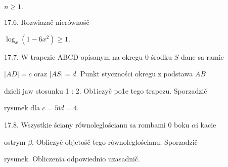 \documentclass[a4paper,12pt]{article}
\begin{document}
$n\geq 1.$

17.6. Rozwiazač nierównośč

$\log_{x}(1-6x^{2})\geq 1.$

17.7. $\mathrm{W}$ trapezie ABCD opisanym na okregu $0$ środku $S$ dane sa ramie

$|AD| =c$ oraz $|AS| =d$. Punkt styczności okregu $\mathrm{z}$ podstawa $AB$

dzieli $\mathrm{j}\mathrm{a}\mathrm{w}$ stosunku 1 : 2. Ob1iczyč po1e tego trapezu. Sporzadzič

rysunek dla $c=5\mathrm{i}d=4.$

17.8. Wszystkie ściany równoleglościanu sa rombami $0$ boku $\alpha \mathrm{i}$ kacie

ostrym $\beta$. Obliczyč objetośč tego równoleglościanu. Sporzadzič

rysunek. Obliczenia odpowiednio uzasadnič.
\end{document}
